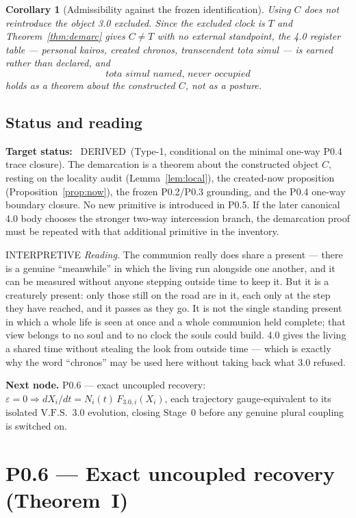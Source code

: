 \documentclass[11pt,a4paper]{article}
\newcommand{\VFS}{\ensuremath{\mathrm{V.F.S.}}}
\newcommand{\stDerived}{\textcolor{cDer}{\textsf{\small DERIVED}}}
\newcommand{\stInterp}{\textcolor{cInt}{\textsf{\small INTERPRETIVE}}}
\theoremstyle{definition}
\theoremstyle{plain}
\newtheorem{corollary}[definition]{Corollary}
\theoremstyle{remark}
\begin{document}
\begin{corollary}[Admissibility against the frozen identification]\label{cor:adm}
Using \(C\) does not reintroduce the object 3.0 excluded. Since the excluded clock is
\(T\) and Theorem~\ref{thm:demarc} gives \(C\neq T\) with no external standpoint, the
4.0 register table --- personal kairos, created chronos, transcendent \textit{tota
simul} --- is earned rather than declared, and
\[
\textit{tota simul named, never occupied}
\]
holds as a theorem about the constructed \(C\), not as a posture.
\end{corollary}

\subsection{Status and reading}

\textbf{Target status:}~
\stDerived\ (Type-1, conditional on the minimal one-way P0.4 trace closure). The
demarcation is a theorem about the constructed object \(C\), resting on the locality
audit (Lemma~\ref{lem:local}), the created-now proposition (Proposition~\ref{prop:now}),
the frozen P0.2/P0.3 grounding, and the P0.4 one-way boundary closure. No new primitive
is introduced in P0.5. If the later canonical 4.0 body chooses the stronger two-way
intercession branch, the demarcation proof must be repeated with that additional
primitive in the inventory.

\medskip
\stInterp\quad
\emph{Reading.}
The communion really does share a present --- there is a genuine ``meanwhile'' in which
the living run alongside one another, and it can be measured without anyone stepping
outside time to keep it. But it is a creaturely present: only those still on the road are
in it, each only at the step they have reached, and it passes as they go. It is not the
single standing present in which a whole life is seen at once and a whole communion held
complete; that view belongs to no soul and to no clock the souls could build. 4.0 gives
the living a shared time without stealing the look from outside time --- which is exactly
why the word ``chronos'' may be used here without taking back what 3.0 refused.

\medskip
\textbf{Next node.} P0.6 --- exact uncoupled recovery: \(\varepsilon=0\Rightarrow
dX_i/dt=N_i(t)\,F_{3.0,i}(X_i)\), each trajectory gauge-equivalent to its isolated
\VFS\ 3.0 evolution, closing Stage~0 before any genuine plural coupling is switched on.

\section{P0.6 --- Exact uncoupled recovery (Theorem~I)}
\end{document}
